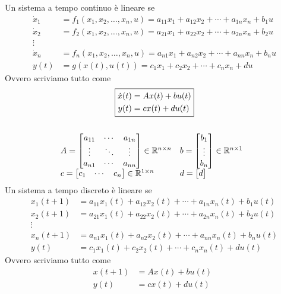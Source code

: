 \documentclass[10pt,a4paper]{book}
\begin{document}
Un sistema a tempo continuo è lineare se
\begin{align*}
\dot{x}_1 & =f_1( x_1 ,x_2 ,\dotsc ,x_n ,u) =a_{11} x_1 +a_{12} x_2 +\cdots +a_{1n} x_n +b_1 u\\
\dot{x}_2 & =f_2( x_1 ,x_2 ,\dotsc ,x_n ,u) =a_{21} x_1 +a_{22} x_2 +\cdots +a_{2n} x_n +b_2 u\\
\vdots  & \\
\dot{x}_n & =f_n( x_1 ,x_2 ,\dotsc ,x_n ,u) =a_{n1} x_1 +a_{n2} x_2 +\cdots +a_{nn} x_n +b_n u\\
y(t) & =g(x(t),u(t) )=c_1 x_1 +c_2 x_2 +\cdots +c_n x_n +du
\end{align*}
Ovvero scriviamo tutto come
\begin{gather*}
\boxed{\begin{aligned}
\dot{x}(t) & =Ax(t) +bu(t)\\
y(t) & =cx(t) +du(t)
\end{aligned}}\\
\\
\begin{array}{ l l }
A=\begin{bmatrix}
a_{11} & \cdots  & a_{1n}\\
\vdots  & \ddots  & \vdots \\
a_{n1} & \cdots  & a_{nn}
\end{bmatrix} \in \mathbb{R}^{n\times n} & b=\begin{bmatrix}
b_1\\
\vdots \\
b_n
\end{bmatrix} \in \mathbb{R}^{n\times 1}\\
c=\begin{bmatrix}
c_1 & \cdots  & c_n
\end{bmatrix} \in \mathbb{R}^{1\times n} & d=\begin{bmatrix}
d
\end{bmatrix}
\end{array} \ \ 
\end{gather*}
Un sistema a tempo discreto è lineare se
\begin{align*}
x_1( t+1) & =a_{11} x_1(t) +a_{12} x_2(t) +\cdots +a_{1n} x_n(t) +b_1 u(t)\\
x_2( t+1) & =a_{21} x_1(t) +a_{22} x_2(t) +\cdots +a_{2n} x_n(t) +b_2 u(t)\\
\vdots  & \\
x_n( t+1) & =a_{n1} x_1(t) +a_{n2} x_2(t) +\cdots +a_{nn} x_n(t) +b_n u(t)\\
y(t) & =c_1 x_1(t) +c_2 x_2(t) +\cdots +c_n x_n(t) +du(t)
\end{align*}
Ovvero scriviamo tutto come
\begin{equation*}
\boxed{\begin{aligned}
x( t+1) & =Ax(t) +bu(t)\\
y(t) & =cx(t) +du(t)
\end{aligned} \ \ }
\end{equation*}
\end{document}
